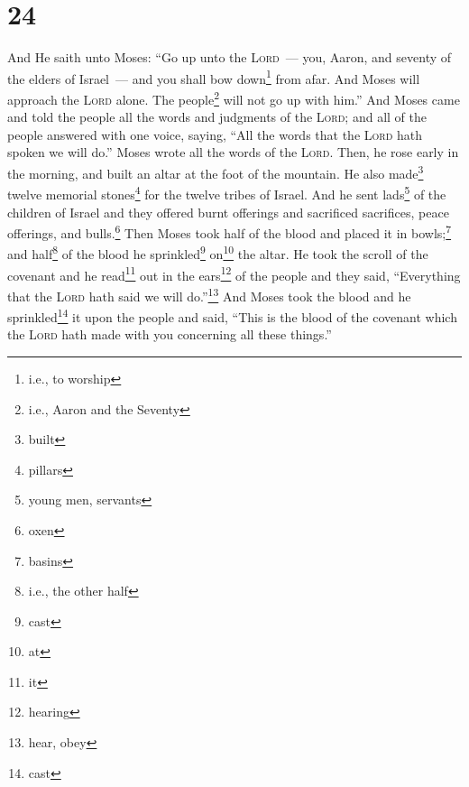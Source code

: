 \section{24}
\begin{enumerate}[align=center]
     And He saith unto Moses: ``Go up unto the \textsc{Lord}~--- you, Aaron, and seventy of the elders of Israel~--- and you shall bow down\footnote{i.e., to worship} from afar.%
     And Moses will approach the \textsc{Lord} alone. The people\footnote{i.e., Aaron and the Seventy} will not go up with him.''%
     And Moses came and told the people all the words and judgments of the \textsc{Lord}; and all of the people answered with one voice, saying, ``All the words that the \textsc{Lord} hath spoken we will do.''%
     Moses wrote all the words of the \textsc{Lord}. Then, he rose early in the morning, and built an altar at the foot of the mountain. He also made\footnote{built} twelve memorial stones\footnote{pillars} for the twelve tribes of Israel.%
     And he sent lads\footnote{young men, servants} of the children of Israel and they offered burnt offerings and sacrificed sacrifices, peace offerings, and bulls.\footnote{oxen}%
     Then Moses took half of the blood and placed it in bowls;\footnote{basins} and half\footnote{i.e., the other half} of the blood he sprinkled\footnote{cast} on\footnote{at} the altar.%
     He took the scroll of the covenant and he read\footnote{it} out in the ears\footnote{hearing} of the people and they said, ``Everything that the \textsc{Lord} hath said we will do.''\footnote{hear, obey}%
     And Moses took the blood and he sprinkled\footnote{cast} it upon the people and said, ``This is the blood of the covenant which the \textsc{Lord} hath made with you concerning all these things.''%
\end{enumerate}

